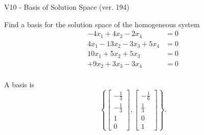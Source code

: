 \begin{exercise}
  \begin{exerciseTitle}V10 - Basis of Solution Space (ver. 194)\end{exerciseTitle}
  \begin{exerciseStatement}
    Find a basis for the solution space of the homogeneous system 
\begin{align*}
 -4 x_ 1 + 4 x_ 2 -2 x_ 4 &= 0  \\ 
  4 x_ 1 -13 x_ 2 -3 x_ 3 + 5 x_ 4 &= 0  \\ 
  10 x_ 1 + 5 x_ 2 + 5 x_ 3 &= 0  \\ 
  + 9 x_ 2 + 3 x_ 3 -3 x_ 4 &= 0  \\ 
 \end{align*}


 
  \end{exerciseStatement}

  \begin{exerciseAnswer}
   A basis is   
\[\left\{\left[\begin{array}{c}
-\frac{1}{3} \\
-\frac{1}{3} \\
1 \\
0
\end{array}\right] , \left[\begin{array}{c}
-\frac{1}{6} \\
\frac{1}{3} \\
0 \\
1
\end{array}\right]\right\}.\]

  


  \end{exerciseAnswer}
\end{exercise}